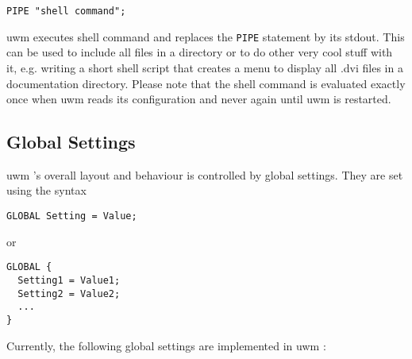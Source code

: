 \documentclass[10pt,a4paper]{article}
\newcommand{\uwm}{{\sc uwm} }
\begin{document}
\begin{verbatim}
PIPE "shell command";
\end{verbatim}

\uwm executes shell command and replaces the \texttt{PIPE} statement by its
stdout. This can be used to include all files in a directory or to do other
very cool stuff with it, e.g. writing a short shell script that creates a menu
to display all .dvi files in a documentation directory. Please note that the
shell command is evaluated exactly once when uwm reads its configuration and
never again until uwm is restarted.

\subsection{Global Settings}

\uwm's overall layout and behaviour is controlled by global settings. They are
set using the syntax

\begin{verbatim}
GLOBAL Setting = Value;
\end{verbatim}

or

\begin{verbatim}
GLOBAL {
  Setting1 = Value1;
  Setting2 = Value2;
  ...
}
\end{verbatim}

Currently, the following global settings are implemented in \uwm:
\end{document}
